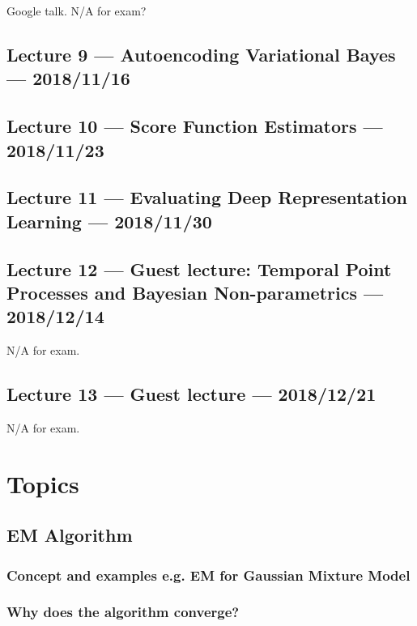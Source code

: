 \documentclass{article}
\begin{document}
Google talk. N/A for exam?

\subsection{Lecture 9 --- Autoencoding Variational Bayes --- 2018/11/16}

\subsection{Lecture 10 --- Score Function Estimators --- 2018/11/23}

\subsection{Lecture 11 --- Evaluating Deep Representation Learning --- 2018/11/30}

\subsection{Lecture 12 --- Guest lecture: Temporal Point Processes and Bayesian Non-parametrics --- 2018/12/14}

N/A for exam.

\subsection{Lecture 13 --- Guest lecture --- 2018/12/21}

N/A for exam.







\section{Topics}



\subsection{EM Algorithm}

\subsubsection{Concept and examples e.g. EM for Gaussian Mixture Model}


\subsubsection{Why does the algorithm converge?}
\end{document}
